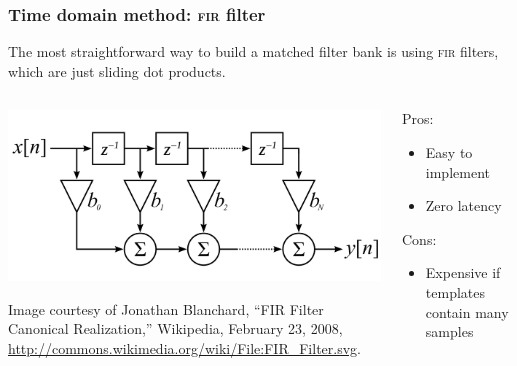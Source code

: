 \documentclass{beamer}
\begin{document}
\begin{frame}
	\frametitle{Time domain method: \textsc{fir} filter}
	The most straightforward way to build a matched filter bank is using \textsc{fir} filters, which are just sliding dot products.

	\begin{columns}
		\begin{column}{0.6\textwidth}
			\includegraphics[width=\textwidth]{figures/fir}
			\begin{flushleft}
				\scriptsize{Image courtesy of Jonathan Blanchard, ``FIR Filter Canonical Realization,'' Wikipedia, February 23, 2008, \url{http://commons.wikimedia.org/wiki/File:FIR_Filter.svg}.}
			\end{flushleft}
		\end{column}
		\begin{column}{0.4\textwidth}
			Pros:
			\begin{itemize}
				\item Easy to implement
				\item Zero latency
			\end{itemize}
			Cons:
			\begin{itemize}
				\item Expensive if templates contain many samples
			\end{itemize}
		\end{column}
	\end{columns}
\end{frame}
\end{document}

